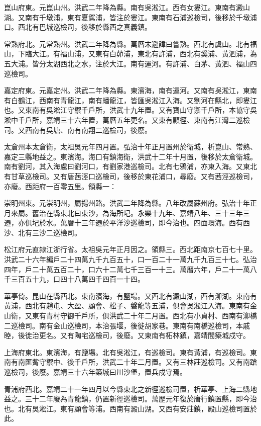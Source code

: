 崑山府東。元崑山州。洪武二年降為縣。南有吳淞江。西有女婁江。東南有澱山湖。又南有千墩浦，東有夏駕浦，皆注於婁江。東南有石浦巡檢司，後移於千墩浦口。西北有巴城巡檢司，後移於縣西之真義鎮。

常熟府北。元常熟州。洪武二年降為縣。萬曆末避諱曰嘗熟。西北有虞山。北有福山，下臨大江。有福山浦，又東有白茆浦，東北有許浦，西北有奚浦、黃泗浦，為五大浦。皆分太湖西北之水，注於大江。南有運河。有許浦、白茅、黃泗、福山四巡檢司。

嘉定府東。元嘉定州。洪武二年降為縣。東濱海，南有運河。又南有吳淞江，東南有白鶴江，西南有青龍江，南有蟠龍江，皆匯吳淞江入海。又劉河在縣北，即婁江也。又東南有吳淞江守禦千戶所，洪武十九年置。又有寶山守禦千戶所，本協守吳淞中千戶所，嘉靖三十六年置，萬曆五年更名。又東有顧徑、東南有江灣二巡檢司。又西南有吳塘、南有南翔二巡檢司，後廢。

太倉州本太倉衛，太祖吳元年四月置。弘治十年正月置州於衛城，析崑山、常熟、嘉定三縣地益之。東濱海。海口有鎮海衛，洪武十二年十月置，後移於太倉衛城。南有劉河，其入海處曰劉河口，有劉家港巡檢司。北有七鴉浦，亦東入海。又東北有甘草巡檢司。又有唐茜涇口巡檢司，後移於東花浦口，尋廢。又有茜涇巡檢司，亦廢。西距府一百零五里。領縣一：

崇明州東。元崇明州，屬揚州路。洪武二年降為縣。八年改屬蘇州府。弘治十年正月來屬。舊治在縣東北曰東沙，為海所圮。永樂十九年、嘉靖八年、三十三年三遷，亦俱圮於水。萬曆十三年遷於平洋沙巡檢司，即今治也。四面環海。西有西沙、北有三沙二巡檢司。

松江府元直隸江浙行省。太祖吳元年正月因之。領縣三。西北距南京七百七十里。洪武二十六年編戶二十四萬九千九百五十，口一百二十一萬九千九百三十七。弘治四年，戶二十萬五百二十，口六十二萬七千三百一十三。萬曆六年，戶二十一萬八千三百五十九，口四十八萬四千四百一十四。

華亭倚。昆山在縣西北。東南濱海，有鹽場。又西北有澱山湖，西有泖湖。東南有黃浦，西北有趙屯、大盈、顧會、松子、磐龍等五浦，俱會吳淞江入海。東南有金山衛，又東有青村守御千戶所，俱洪武二十年二月置。西北有小貞村、西南有泖橋二巡檢司。南有金山巡檢司，本治張堰，後徙胡家巷。東南有南橋巡檢司，本戚睦，後徙治更名。又有陶宅巡檢司，後廢。又東南有柘林鎮，嘉靖間築城戍守。

上海府東北。東濱海，有鹽場。北有吳淞江，有巡檢司。東有黃浦，有巡檢司。東南有南匯觜守禦中、後千戶所，洪武二十年二月置。又有三林莊巡檢司。又有南蹌巡檢司，後廢。嘉靖三十六年築城曰川沙堡，置兵戍守焉。

青浦府西北。嘉靖二十一年四月以今縣東北之新徑巡檢司置，析華亭、上海二縣地益之。三十二年廢為青龍鎮，仍置新徑巡檢司。萬歷元年復於唐行鎮置縣，即今治也。北有吳淞江。東有顧會等浦。西南有澱山湖。又西有安莊鎮，殿山巡檢司置於此。

